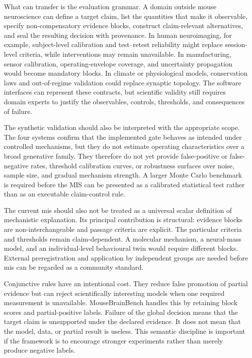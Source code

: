 What can transfer is the evaluation grammar. A domain outside mouse neuroscience
can define a target claim, list the quantities that make it observable, specify
non-compensatory evidence blocks, construct claim-relevant alternatives, and
seal the resulting decision with provenance. In human neuroimaging, for
example, subject-level calibration and test--retest reliability might replace
session-level criteria, while interventions may remain unavailable. In
manufacturing, sensor calibration, operating-envelope coverage, and uncertainty
propagation would become mandatory blocks. In climate or physiological models,
conservation laws and out-of-regime validation could replace synaptic topology.
The software interfaces can represent these contracts, but scientific validity
still requires domain experts to justify the observables, controls, thresholds,
and consequences of failure.


The synthetic validation should also be interpreted with the appropriate scope. The four systems confirm that the implemented gate behaves as intended under controlled mechanisms, but they do not estimate operating characteristics over a broad generative family. They therefore do not yet provide false-positive or false-negative rates, threshold calibration curves, or robustness surfaces over noise, sample size, and gradual mechanism strength. A larger Monte Carlo benchmark is required before the MIS can be presented as a calibrated statistical test rather than as an executable claim-control rule.

The current \acs{mis} should also not be treated as a universal scalar definition of
mechanistic explanation. Its principal contribution is structural: evidence
blocks are non-interchangeable and passage criteria are explicit. The particular
criteria and thresholds remain claim-dependent. A molecular mechanism, a
neural-mass model, and an individual-level behavioural twin would require
different blocks. External preregistration and application by independent groups
are needed before \acs{mis} can be regarded as a community standard.

Conjunctive rules have an intentional cost. They reduce false promotion of
partial evidence but can reject scientifically interesting models when one
required measurement is unavailable. MouseBrainBench handles this by retaining
block scores and partial-positive labels. Failure of the global decision means
that the target claim is unsupported under the declared evidence. It does not
mean that the model, data, or partial result is useless. This semantic discipline
is important if the framework is to encourage stronger experiments rather than
merely produce negative labels.

